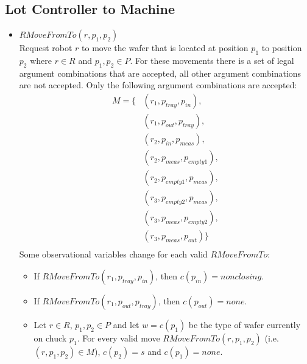 \subsection{Lot Controller to Machine}
\begin{itemize}
    \item $\mathit{RMoveFromTo}(r, p_1, p_2)$ \\
        Request robot $r$ to move the wafer that is located at position $p_1$ to position $p_2$ where $r \in R$ and $p_1, p_2 \in P$.
        For these movements there is a set of legal argument combinations that are accepted, all other argument combinations are not accepted.
        Only the following argument combinations are accepted:
        \begin{align*}
            M = \{ & \left(r_1, p_\mathit{tray},   p_\mathit{in}     \right), \\
                   & \left(r_1, p_\mathit{out},    p_\mathit{tray}   \right), \\
                   & \left(r_2, p_\mathit{in},     p_\mathit{meas}   \right), \\
                   & \left(r_2, p_\mathit{meas},   p_\mathit{empty1} \right), \\
                   & \left(r_2, p_\mathit{empty1}, p_\mathit{meas}   \right), \\
                   & \left(r_3, p_\mathit{empty2}, p_\mathit{meas}   \right), \\
                   & \left(r_3, p_\mathit{meas},   p_\mathit{empty2} \right), \\
                   & \left(r_3, p_\mathit{meas},   p_\mathit{out}    \right)\} \\
        \end{align*}
        Some observational variables change for each valid $\mathit{RMoveFromTo}$:
        \begin{itemize}
            \item If $\mathit{RMoveFromTo}\left(r_1, p_\mathit{tray}, p_\mathit{in}\right)$, then $c\left(p_\mathit{in}\right) = \mathit{nonclosing}$.
            \item If $\mathit{RMoveFromTo}\left(r_1, p_\mathit{out}, p_\mathit{tray}\right)$, then $c\left(p_\mathit{out}\right) = \mathit{none}$.
            \item Let $r \in R$, $p_1, p_2 \in P$ and let $w = c\left(p_1\right)$ be the type of wafer currently on chuck $p_1$.
                For every valid move $\mathit{RMoveFromTo}\left(r, p_1, p_2\right)$ (i.e. $\left(r, p_1, p_2\right) \in M$), $c\left(p_2\right) = s$ and $c\left(p_1\right) = none$.
        \end{itemize}


\end{itemize}
